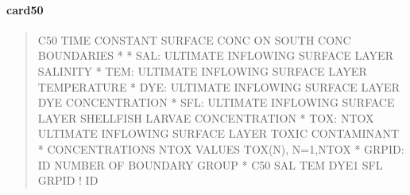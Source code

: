 \documentclass[letterpaper,10pt,english]{sphinxmanual}
\begin{document}
\paragraph{card50}
\label{\detokenize{inputfiles/runcontrol/card50:card50}}\label{\detokenize{inputfiles/runcontrol/card50::doc}}\begin{quote}

\begin{sphinxVerbatim}[commandchars=\\\{\}]
\PYGZhy{}\PYGZhy{}\PYGZhy{}\PYGZhy{}\PYGZhy{}\PYGZhy{}\PYGZhy{}\PYGZhy{}\PYGZhy{}\PYGZhy{}\PYGZhy{}\PYGZhy{}\PYGZhy{}\PYGZhy{}\PYGZhy{}\PYGZhy{}\PYGZhy{}\PYGZhy{}\PYGZhy{}\PYGZhy{}\PYGZhy{}\PYGZhy{}\PYGZhy{}\PYGZhy{}\PYGZhy{}\PYGZhy{}\PYGZhy{}\PYGZhy{}\PYGZhy{}\PYGZhy{}\PYGZhy{}\PYGZhy{}\PYGZhy{}\PYGZhy{}\PYGZhy{}\PYGZhy{}\PYGZhy{}\PYGZhy{}\PYGZhy{}\PYGZhy{}\PYGZhy{}\PYGZhy{}\PYGZhy{}\PYGZhy{}\PYGZhy{}\PYGZhy{}\PYGZhy{}\PYGZhy{}\PYGZhy{}\PYGZhy{}\PYGZhy{}\PYGZhy{}\PYGZhy{}\PYGZhy{}\PYGZhy{}\PYGZhy{}\PYGZhy{}\PYGZhy{}\PYGZhy{}\PYGZhy{}\PYGZhy{}\PYGZhy{}\PYGZhy{}\PYGZhy{}\PYGZhy{}\PYGZhy{}\PYGZhy{}\PYGZhy{}\PYGZhy{}\PYGZhy{}\PYGZhy{}\PYGZhy{}\PYGZhy{}\PYGZhy{}\PYGZhy{}\PYGZhy{}\PYGZhy{}\PYGZhy{}
C50 TIME CONSTANT SURFACE CONC ON SOUTH CONC BOUNDARIES
*
*    SAL: ULTIMATE INFLOWING SURFACE LAYER SALINITY
*    TEM: ULTIMATE INFLOWING SURFACE LAYER TEMPERATURE
*    DYE: ULTIMATE INFLOWING SURFACE LAYER DYE CONCENTRATION
*    SFL: ULTIMATE INFLOWING SURFACE LAYER SHELLFISH LARVAE CONCENTRATION
*    TOX: NTOX ULTIMATE INFLOWING SURFACE LAYER TOXIC CONTAMINANT
*         CONCENTRATIONS NTOX VALUES TOX(N), N=1,NTOX
*  GRPID: ID NUMBER OF BOUNDARY GROUP
*
C50       SAL       TEM      DYE1       SFL      GRPID ! ID
\end{sphinxVerbatim}
\end{quote}
\end{document}
